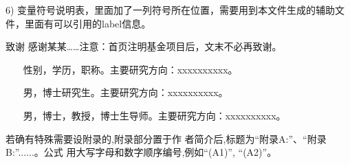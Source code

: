 \documentclass[10.5pt,twocolumn]{jbuaa}
\begin{document}
6) 变量符号说明表，里面加了一列符号所在位置，需要用到本文件生成的辅助文件，里面有可以引用的label信息。


\vspace{1em}
{\hei\wuhao 致谢\quad}
{\fang\wuhao
感谢某某……注意：首页注明基金项目后，文末不必再致谢。
}




\renewcommand\refname{\hei\wuhao\centerline{参考文献（References）}\global\def\refname{参考文献}}
\vskip 12pt

\let\OLDthebibliography\thebibliography
\renewcommand\thebibliography[1]{
 \OLDthebibliography{#1}
 \setlength{\parskip}{0pt}
 \setlength{\itemsep}{0pt plus 0.3ex}
}

{
\renewcommand{\baselinestretch}{0.9}
\liuhao


}



{
\xiaowuhao
{}

~~~ 性别，学历，职称。主要研究方向：xxxxxxxxxx。
\vskip 16pt

~~~ 男，博士研究生。主要研究方向：xxxxxxxxxx。
\vskip 16pt

~~~ 男，博士，教授，博士生导师。主要研究方向：xxxxxxxxxx。
}


\vskip 20pt


若确有特殊需要设附录的,附录部分置于作
者简介后,标题为“附录A:”、“附录B:”......。公式
用大写字母和数字顺序编号,例如“(A1)”, “(A2)”。




\clearpage
\newpage
\pagestyle{fancy}
\fancyhf{}
\lhead{}
\rhead{}
\lfoot{}
\cfoot{}
\rfoot{}
\renewcommand{\headrule}{%
\hrule height0.4pt width \headwidth \vskip1.0pt%
\hrule height0.4pt width \headwidth \vskip-2pt}
\end{document}

